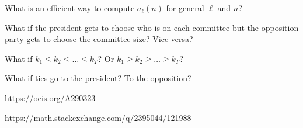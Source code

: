 \documentclass{article}
\begin{document}
\begin{question}
  What is an efficient way to compute $a_\ell(n)$ for general $\ell$ and $n$?
\end{question}
\begin{related}
  \item What if the president gets to choose who is on each committee but the
    opposition party gets to choose the committee size? Vice versa?
  \item What if $k_1 \leq k_2 \leq \hdots \leq k_T$? Or $k_1 \geq k_2 \geq \hdots \geq k_T$?
  \item What if ties go to the president? To the opposition?
\end{related}
\begin{references}
  \item https://oeis.org/A290323
  \item https://math.stackexchange.com/q/2395044/121988
\end{references}
\end{document}

